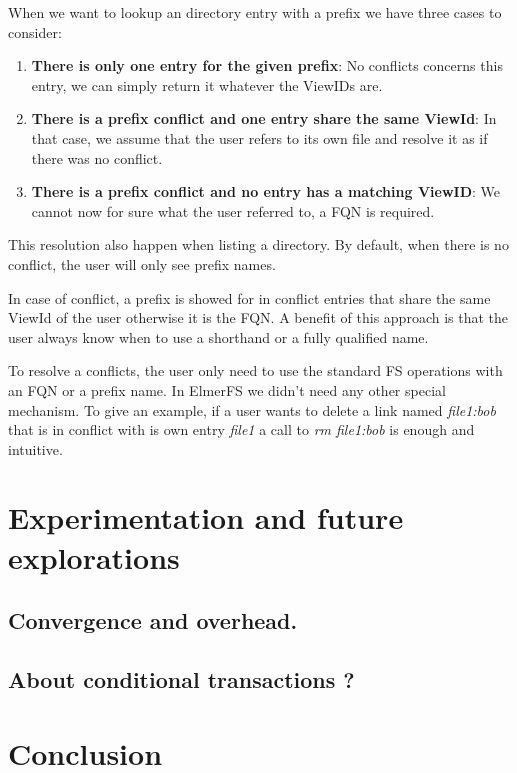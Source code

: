 \documentclass[sigplan, 10pt]{acmart}
\begin{document}
When we want to lookup an directory entry with a prefix we have three
cases to consider:

\begin{enumerate}
    \item \textbf{There is only one entry for the given prefix}: No conflicts
    concerns this entry, we can simply return it whatever the ViewIDs are.
    \item \textbf{There is a prefix conflict and one entry share the same ViewId}:
    In that case, we assume that the user refers to its own file and resolve it
    as if there was no conflict.
    \item \textbf{There is a prefix conflict and no entry has a matching ViewID}:
    We cannot now for sure what the user referred to, a FQN is required.
\end{enumerate}

This resolution also happen when listing a directory. By default,
when there is no conflict, the user will only see prefix names.

In case of conflict, a prefix is showed for in conflict entries that share
the same ViewId of the user otherwise it is
the FQN. A benefit of this approach is that the user always know when to use
a shorthand or a fully qualified name.

To resolve a conflicts, the user only need to use the standard
FS operations with an FQN or a prefix name. In ElmerFS we didn't need any other
special mechanism.
To give an example,
if a user wants to delete a link named \textit{file1:bob} that is in conflict
with is own entry \textit{file1} a call to \textit{rm file1:bob}
is enough and intuitive.

\section{Experimentation and future explorations}

\subsection{Convergence and overhead.}
\subsection{About conditional transactions ?}

\section{Conclusion}
\end{document}
